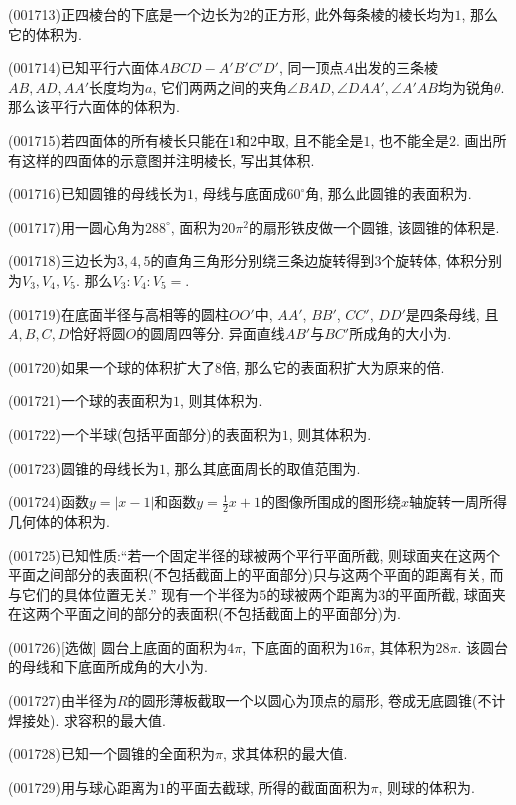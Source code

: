 \item (001713)正四棱台的下底是一个边长为$2$的正方形, 此外每条棱的棱长均为$1$, 那么它的体积为.
\item (001714)已知平行六面体$ABCD-A'B'C'D'$, 同一顶点$A$出发的三条棱$AB,AD,AA'$长度均为$a$, 它们两两之间的夹角$\angle BAD,\angle DAA',\angle A'AB$均为锐角$\theta$. 那么该平行六面体的体积为.
\item (001715)若四面体的所有棱长只能在$1$和$2$中取, 且不能全是$1$, 也不能全是$2$. 画出所有这样的四面体的示意图并注明棱长, 写出其体积.
\item (001716)已知圆锥的母线长为$1$, 母线与底面成$60^\circ$角, 那么此圆锥的表面积为.
\item (001717)用一圆心角为$288^\circ$, 面积为$20\pi^2$的扇形铁皮做一个圆锥, 该圆锥的体积是.
\item (001718)三边长为$3,4,5$的直角三角形分别绕三条边旋转得到$3$个旋转体, 体积分别为$V_3,V_4,V_5$. 那么$V_3:V_4:V_5=$.
\item (001719)在底面半径与高相等的圆柱$OO'$中, $AA'$, $BB'$, $CC'$, $DD'$是四条母线, 且$A,B,C,D$恰好将圆$O$的圆周四等分. 异面直线$AB'$与$BC'$所成角的大小为.
\item (001720)如果一个球的体积扩大了$8$倍, 那么它的表面积扩大为原来的倍.
\item (001721)一个球的表面积为$1$, 则其体积为.
\item (001722)一个半球(包括平面部分)的表面积为$1$, 则其体积为.
\item (001723)圆锥的母线长为$1$, 那么其底面周长的取值范围为.
\item (001724)函数$y=|x-1|$和函数$y=\frac{1}{2}x+1$的图像所围成的图形绕$x$轴旋转一周所得几何体的体积为.
\item (001725)已知性质:``若一个固定半径的球被两个平行平面所截, 则球面夹在这两个平面之间部分的表面积(不包括截面上的平面部分)只与这两个平面的距离有关, 而与它们的具体位置无关.''
现有一个半径为$5$的球被两个距离为$3$的平面所截, 球面夹在这两个平面之间的部分的表面积(不包括截面上的平面部分)为.
\item (001726)[选做]
圆台上底面的面积为$4\pi$, 下底面的面积为$16\pi$, 其体积为$28\pi$. 该圆台的母线和下底面所成角的大小为.
\item (001727)由半径为$R$的圆形薄板截取一个以圆心为顶点的扇形, 卷成无底圆锥(不计焊接处). 求容积的最大值.
\item (001728)已知一个圆锥的全面积为$\pi$, 求其体积的最大值.
\item (001729)用与球心距离为$1$的平面去截球, 所得的截面面积为$\pi$, 则球的体积为.

